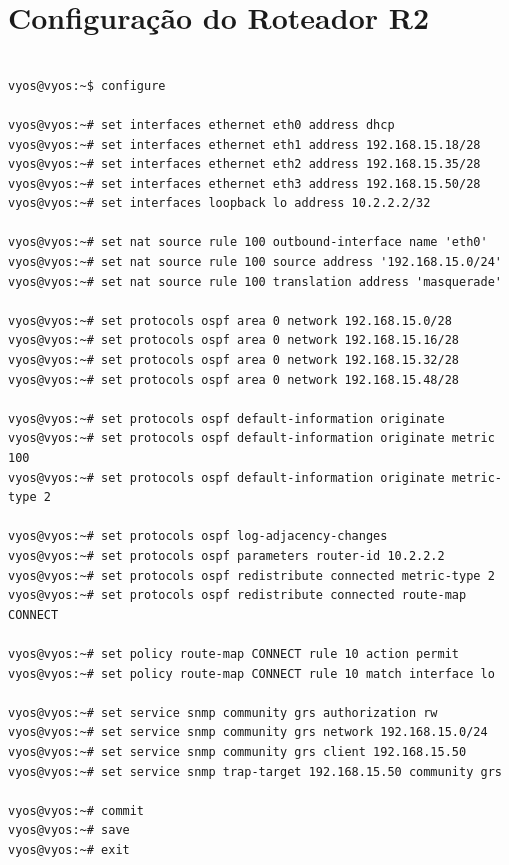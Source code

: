 \section{Configuração do Roteador R2}

\begin{listing}[H]
\centering
\begin{verbatim}

vyos@vyos:~$ configure

vyos@vyos:~# set interfaces ethernet eth0 address dhcp
vyos@vyos:~# set interfaces ethernet eth1 address 192.168.15.18/28
vyos@vyos:~# set interfaces ethernet eth2 address 192.168.15.35/28
vyos@vyos:~# set interfaces ethernet eth3 address 192.168.15.50/28
vyos@vyos:~# set interfaces loopback lo address 10.2.2.2/32

vyos@vyos:~# set nat source rule 100 outbound-interface name 'eth0'
vyos@vyos:~# set nat source rule 100 source address '192.168.15.0/24'
vyos@vyos:~# set nat source rule 100 translation address 'masquerade'

vyos@vyos:~# set protocols ospf area 0 network 192.168.15.0/28
vyos@vyos:~# set protocols ospf area 0 network 192.168.15.16/28
vyos@vyos:~# set protocols ospf area 0 network 192.168.15.32/28
vyos@vyos:~# set protocols ospf area 0 network 192.168.15.48/28

vyos@vyos:~# set protocols ospf default-information originate
vyos@vyos:~# set protocols ospf default-information originate metric 100
vyos@vyos:~# set protocols ospf default-information originate metric-type 2

vyos@vyos:~# set protocols ospf log-adjacency-changes
vyos@vyos:~# set protocols ospf parameters router-id 10.2.2.2
vyos@vyos:~# set protocols ospf redistribute connected metric-type 2
vyos@vyos:~# set protocols ospf redistribute connected route-map CONNECT

vyos@vyos:~# set policy route-map CONNECT rule 10 action permit
vyos@vyos:~# set policy route-map CONNECT rule 10 match interface lo

vyos@vyos:~# set service snmp community grs authorization rw
vyos@vyos:~# set service snmp community grs network 192.168.15.0/24
vyos@vyos:~# set service snmp community grs client 192.168.15.50
vyos@vyos:~# set service snmp trap-target 192.168.15.50 community grs

vyos@vyos:~# commit
vyos@vyos:~# save
vyos@vyos:~# exit 

\end{verbatim}
\caption{Configuração de Roteador R2}
\label{lst:rotR2}
\end{listing}

